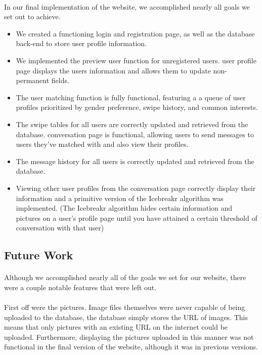 \documentclass{article}
\begin{document}
    \paragraph{}
    In our final implementation of the website, we accomplished nearly all goals we set out to achieve.
    \begin{itemize}
    \item We created a functioning login and registration page, as well as the database back-end to store user profile information.
    \item We implemented the preview user function for unregistered users.
    \itemThe user profile page displays the users information and allows them to update non-permanent fields.
    \item The user matching function is fully functional, featuring a a queue of user profiles prioritized by gender preference, swipe history, and common interests.
    \item The swipe tables for all users are correctly updated and retrieved from the database.
    \itemThe conversation page is functional, allowing users to send messages to users they've matched with and also view their profiles.
    \item The message history for all users is correctly updated and retrieved from the database.
    \item Viewing other user profiles from the conversation page correctly display their information and a primitive version of the Icebreakr algorithm was implemented. (The Icebreakr algorithm hides certain information and pictures on a user's profile page until you have attained a certain threshold of conversation with that user)
    \end{itemize}
    \subsection{Future Work}
    \paragraph{}
    Although we accomplished nearly all of the goals we set for our website, there were a couple notable features that were left out.
    \paragraph{}First off were the pictures. Image files themselves were never capable of being uploaded to the database, the database simply stores the URL of images. This means that only pictures with an existing URL on the internet could be uploaded. Furthermore, displaying the pictures uploaded in this manner was not functional in the final version of the website, although it was in previous versions.
\end{document}
